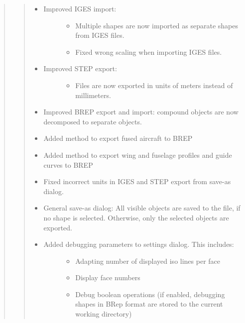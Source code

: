 \documentclass[]{scrartcl}
\begin{document}
\begin{quote}
\begin{itemize}
  \begin{quote}
  \begin{itemize}
  \item
    \begin{description}
    \item[Improved IGES import:]
    \begin{itemize}
    \itemsep1pt\parskip0pt
    \item
      Multiple shapes are now imported as separate shapes from IGES
      files.
    \item
      Fixed wrong scaling when importing IGES files.
    \end{itemize}
    \end{description}
  \item
    \begin{description}
    \item[Improved STEP export:]
    \begin{itemize}
    \itemsep1pt\parskip0pt
    \item
      Files are now exported in units of meters instead of millimeters.
    \end{itemize}
    \end{description}
  \item
    Improved BREP export and import: compound objects are now decomposed
    to separate objects.
  \item
    Added method to export fused aircraft to BREP
  \item
    Added method to export wing and fuselage profiles and guide curves
    to BREP
  \item
    Fixed incorrect units in IGES and STEP export from save-as dialog.
  \item
    General save-as dialog: All visible objects are saved to the file,
    if no shape is selected. Otherwise, only the selected objects are
    exported.
  \item
    \begin{description}
    \item[Added debugging parameters to settings dialog. This includes:]
    \begin{itemize}
    \itemsep1pt\parskip0pt
    \item
      Adapting number of displayed iso lines per face
    \item
      Display face numbers
    \item
      Debug boolean operations (if enabled, debugging shapes in BRep
      format are stored to the current working directory)

\end{itemize}
\end{description}
\end{itemize}
\end{quote}
\end{itemize}
\end{quote}
\end{document}

